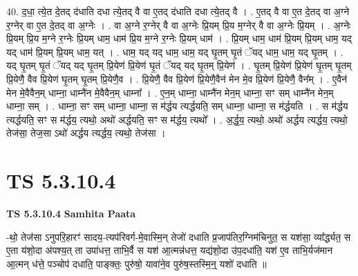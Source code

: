 \documentclass[17pt]{extarticle}
\begin{document}
40. द॒धा॒ त्ये॒त दे॒तद् द॑धाति दधा त्ये॒तद् वै वा ए॒तद् द॑धाति दधा त्ये॒तद् वै । . ए॒तद् वै वा ए॒त दे॒तद् वा अ॒ग्ने र॒ग्नेर् वा ए॒त दे॒तद् वा अ॒ग्नेः । . वा अ॒ग्ने र॒ग्नेर् वै वा अ॒ग्नेः प्रि॒यम् प्रि॒य म॒ग्नेर् वै वा अ॒ग्नेः प्रि॒यम् । . अ॒ग्नेः प्रि॒यम् प्रि॒य म॒ग्ने र॒ग्नेः प्रि॒यम् धाम॒ धाम॑ प्रि॒य म॒ग्ने र॒ग्नेः प्रि॒यम् धाम॑ । . प्रि॒यम् धाम॒ धाम॑ प्रि॒यम् प्रि॒यम् धाम॒ यद् यद् धाम॑ प्रि॒यम् प्रि॒यम् धाम॒ यत् । . धाम॒ यद् यद् धाम॒ धाम॒ यद् घृ॒तम् घृ॒तं ॅयद् धाम॒ धाम॒ यद् घृ॒तम् । . यद् घृ॒तम् घृ॒तं ॅयद् यद् घृ॒तम् प्रि॒येण॑ प्रि॒येण॑ घृ॒तं ॅयद् यद् घृ॒तम् प्रि॒येण॑ । . घृ॒तम् प्रि॒येण॑ प्रि॒येण॑ घृ॒तम् घृ॒तम् प्रि॒येणै॒ वैव प्रि॒येण॑ घृ॒तम् घृ॒तम् प्रि॒येणै॒व । . प्रि॒येणै॒ वैव प्रि॒येण॑ प्रि॒येणै॒वैन॑ मेन मे॒व प्रि॒येण॑ प्रि॒येणै॒ वैन᳚म् । . ए॒वैन॑ मेन मे॒वैवैन॒म् धाम्ना॒ धाम्नै॑न मे॒वैवैन॒म् धाम्ना᳚ । . ए॒न॒म् धाम्ना॒ धाम्नै॑न मेन॒म् धाम्ना॒ सꣳ सम् धाम्नै॑न मेन॒म् धाम्ना॒ सम् । . धाम्ना॒ सꣳ सम् धाम्ना॒ धाम्ना॒ स म॑र्द्धय त्यर्द्धयति॒ सम् धाम्ना॒ धाम्ना॒ स म॑र्द्धयति । . स म॑र्द्धय त्यर्द्धयति॒ सꣳ स म॑र्द्धय॒ त्यथो॒ अथो॑ अर्द्धयति॒ सꣳ स म॑र्द्धय॒ त्यथो᳚ । . अ॒र्द्ध॒य॒ त्यथो॒ अथो॑ अर्द्धय त्यर्द्धय॒ त्यथो॒ तेज॑सा॒ तेज॒सा ऽथो॑ अर्द्धय त्यर्द्धय॒ त्यथो॒ तेज॑सा । \newline
\pagebreak
{}

\section{ TS 5.3.10.4 }

\textbf{TS 5.3.10.4 } \newline
\textbf{Samhita Paata} \newline

-थो॒ तेज॑सा ऽनुपरि॒हारꣳ॑ सादय॒-त्यप॑रिवर्ग-मे॒वास्मि॒न् तेजो॑ दधाति प्र॒जाप॑तिर॒ग्निम॑चिनुत॒ स यश॑सा॒ व्या᳚र्द्ध्यत॒ स ए॒ता य॑शो॒दा अ॑पश्य॒त् ता उपा॑धत्त॒ ताभि॒र्वै स यश॑ आ॒त्मन्न॑धत्त॒ यद्य॑शो॒दा उ॑प॒दधा॑ति॒ यश॑ ए॒व ताभि॒र्यज॑मान आ॒त्मन् ध॑त्ते॒ पञ्चोप॑ दधाति॒ पाङ्क्तः॒ पुरु॑षो॒ यावा॑ने॒व पुरु॑ष॒स्तस्मि॒न्॒ यशो॑ दधाति ॥ \newline
\end{document}
